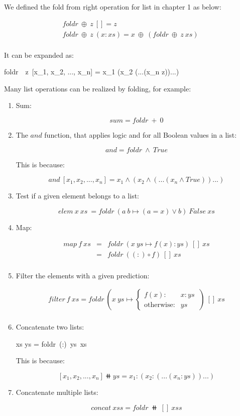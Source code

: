 \documentclass{article}
\begin{document}
We defined the fold from right operation for list in chapter 1 as below:

\[
\begin{array}{l}
foldr\ \oplus\ z\ [] = z \\
foldr\ \oplus\ z\ (x:xs) = x\ \oplus\ (foldr\ \oplus\ z\ xs) \\
\end{array}
\]

It can be expanded as:

\be
foldr\ \oplus\ z\ [x_1, x_2, ..., x_n] = x_1 \oplus (x_2 \oplus (...(x_n \oplus z))...)
\ee

Many list operations can be realized by folding, for example:

\begin{enumerate}
\item Sum:

\[
sum = foldr\ +\ 0
\]

\item The $and$ function, that applies logic and for all Boolean values in a list:

\[
and = foldr\ \land\ True
\]

This is because:

\[
and\ [x_1, x_2, ..., x_n] = x_1 \land (x_2 \land (...(x_n \land True))...)
\]

\item Test if a given element belongs to a list:

\[
elem\ x\ xs\ = foldr\ (a\ b \mapsto (a = x) \lor b)\ False\ xs
\]

\item Map:

\[
\begin{array}{rcl}
map\ f\ xs & = & foldr\ (x\ ys \mapsto f(x) : ys)\ []\ xs \\
           & = & foldr\ ((:) \circ f)\ []\ xs \\
\end{array}
\]

\item Filter the elements with a given prediction:

\[
\begin{array}{rl}
filter\ f\ xs = foldr\ (x\ ys \mapsto
  \begin{cases}
    f(x): & x:ys\ \\
    \text{otherwise}: & ys
  \end{cases})\ []\ xs \\
\end{array}
\]

\item Concatenate two lists:

\be
xs \doubleplus ys = foldr\ (:)\ ys\ xs
\label{eq:binary-concat}
\ee

This is because:

\[
[x_1, x_2, ..., x_n] \doubleplus ys = x_1 : (x_2 : (...(x_n : ys))...)
\]

\item Concatenate multiple lists:

\[
concat\ xss = foldr\ \doubleplus\ []\ xss
\]

\end{enumerate}
\end{document}

